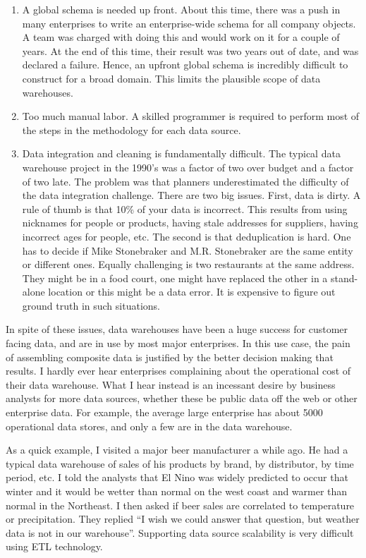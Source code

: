 \documentclass[b5paper,11pt,twoside,openright]{book}
\begin{document}
\begin{enumerate}
  \item
  A global schema is needed up front. About this time, there was a push
  in many enterprises to write an enterprise-wide schema for all company
  objects. A team was charged with doing this and would work on it for a
  couple of years. At the end of this time, their result was two years
  out of date, and was declared a failure. Hence, an upfront global
  schema is incredibly difficult to construct for a broad domain. This
  limits the plausible scope of data warehouses.
  \item
  Too much manual labor. A skilled programmer is required to perform
  most of the steps in the methodology for each data source.
  \item
  Data integration and cleaning is fundamentally difficult. The typical
  data warehouse project in the 1990's was a factor of two over budget
  and a factor of two late. The problem was that planners underestimated
  the difficulty of the data integration challenge. There are two big
  issues. First, data is dirty. A rule of thumb is that 10\% of your
  data is incorrect. This results from using nicknames for people or
  products, having stale addresses for suppliers, having incorrect ages
  for people, etc. The second is that deduplication is hard. One has to
  decide if Mike Stonebraker and M.R. Stonebraker are the same entity or
  different ones. Equally challenging is two restaurants at the same
  address. They might be in a food court, one might have replaced the
  other in a stand-alone location or this might be a data error. It is
  expensive to figure out ground truth in such situations.
\end{enumerate}

In spite of these issues, data warehouses have been a huge success for
customer facing data, and are in use by most major enterprises. In this
use case, the pain of assembling composite data is justified by the
better decision making that results. I hardly ever hear enterprises
complaining about the operational cost of their data warehouse. What I
hear instead is an incessant desire by business analysts for more data
sources, whether these be public data off the web or other enterprise
data. For example, the average large enterprise has about 5000
operational data stores, and only a few are in the data warehouse.

As a quick example, I visited a major beer manufacturer a while ago. He
had a typical data warehouse of sales of his products by brand, by
distributor, by time period, etc. I told the analysts that El Nino was
widely predicted to occur that winter and it would be wetter than normal
on the west coast and warmer than normal in the Northeast. I then asked
if beer sales are correlated to temperature or precipitation. They
replied ``I wish we could answer that question, but weather data is not
in our warehouse''. Supporting data source scalability is very difficult
using ETL technology.
\end{document}
